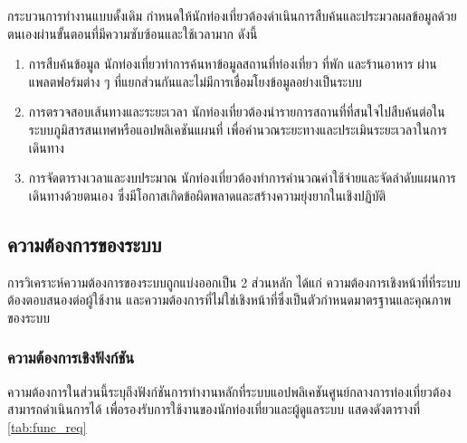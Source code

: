 กระบวนการทำงานแบบดั้งเดิม กำหนดให้นักท่องเที่ยวต้องดำเนินการสืบค้นและประมวลผลข้อมูลด้วยตนเองผ่านขั้นตอนที่มีความซับซ้อนและใช้เวลามาก ดังนี้

\begin{enumerate}[label=(\arabic*),leftmargin=0pt,itemindent=\dimexpr\parindent+\parenlabelwidth+1em\relax,align=right,labelwidth=\parenlabelwidth,labelsep=1em]
\item การสืบค้นข้อมูล นักท่องเที่ยวทำการค้นหาข้อมูลสถานที่ท่องเที่ยว ที่พัก และร้านอาหาร ผ่านแพลตฟอร์มต่าง ๆ ที่แยกส่วนกันและไม่มีการเชื่อมโยงข้อมูลอย่างเป็นระบบ
\item การตรวจสอบเส้นทางและระยะเวลา นักท่องเที่ยวต้องนำรายการสถานที่ที่สนใจไปสืบค้นต่อในระบบภูมิสารสนเทศหรือแอปพลิเคชันแผนที่ เพื่อคำนวณระยะทางและประเมินระยะเวลาในการเดินทาง
\item การจัดตารางเวลาและงบประมาณ นักท่องเที่ยวต้องทำการคำนวณค่าใช้จ่ายและจัดลำดับแผนการเดินทางด้วยตนเอง ซึ่งมีโอกาสเกิดข้อผิดพลาดและสร้างความยุ่งยากในเชิงปฏิบัติ
\end{enumerate}

\subsection{ความต้องการของระบบ}

การวิเคราะห์ความต้องการของระบบถูกแบ่งออกเป็น 2 ส่วนหลัก ได้แก่ ความต้องการเชิงหน้าที่ที่ระบบต้องตอบสนองต่อผู้ใช้งาน และความต้องการที่ไม่ใช่เชิงหน้าที่ซึ่งเป็นตัวกำหนดมาตรฐานและคุณภาพของระบบ

\subsubsection{ความต้องการเชิงฟังก์ชัน}

ความต้องการในส่วนนี้ระบุถึงฟังก์ชันการทำงานหลักที่ระบบแอปพลิเคชันศูนย์กลางการท่องเที่ยวต้องสามารถดำเนินการได้ เพื่อรองรับการใช้งานของนักท่องเที่ยวและผู้ดูแลระบบ แสดงดังตารางที่ \ref{tab:func_req}

